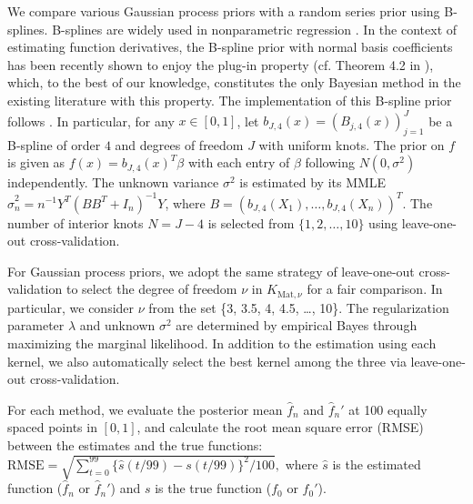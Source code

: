 \documentclass[12pt]{article}
\theoremstyle{plain}
\theoremstyle{nonitalicremark}
\begin{document}
We compare various Gaussian process priors with a random series prior using B-splines. B-splines are widely used in nonparametric regression \citep{james2009functional,wang2020functional}. In the context of estimating function derivatives, the B-spline prior with normal basis coefficients has been recently shown to enjoy the plug-in property (cf. Theorem 4.2 in \cite{yoo2016supremum}), which, to the best of our knowledge, constitutes the only Bayesian method in the existing literature with this property. The implementation of this B-spline prior follows \cite{yoo2016supremum}. In particular, for any $x\in[0,1]$, let $ b_{J,4}(x)=(B_{j,4}(x))_{j=1}^J$ be a B-spline of order $4$ and degrees of freedom $J$ with uniform knots. The prior on $f$ is given as $f(x)=b_{J,4}(x)^T \beta$ with each entry of $\beta$ following $N(0, \sigma^2)$ independently. The unknown variance $\sigma^2$ is estimated by its MMLE $\hat{\sigma}_n^2=n^{-1}Y^T(B B^T+I_n)^{-1}Y$, where $B=(b_{J,4}(X_1),\ldots,b_{J,4}(X_n))^T$. The number of interior knots $N=J-4$ is selected from $\{1, 2, \ldots, 10\}$ using leave-one-out cross-validation. 

For Gaussian process priors, we adopt the same strategy of leave-one-out cross-validation to select the degree of freedom $\nu$ in $K_{\text{Mat},\nu}$ for a fair comparison. In particular, we consider $\nu$ from the set \{3, 3.5, 4, 4.5, \ldots, 10\}. The regularization parameter $\lambda$ and unknown $\sigma^2$ are determined by empirical Bayes through maximizing the marginal likelihood. In addition to the estimation using each kernel, we also automatically select the best kernel among the three via leave-one-out cross-validation.

For each method, we evaluate the posterior mean $\hat{f}_n$ and $\hat{f}_n'$ at 100 equally spaced points in $[0,1]$, and calculate the root mean square error (RMSE) between the estimates and the true functions:
$
\mathrm{RMSE} = \sqrt{\sum_{t = 0}^{99} \{\hat{s}(t/99) - s(t /99)\}^2/100}, 
$
where $\hat{s}$ is the estimated function ($\hat{f}_n$ or $\hat{f}_n'$) and $s$ is the true function ($f_0$ or $f_0'$). 
\end{document}

